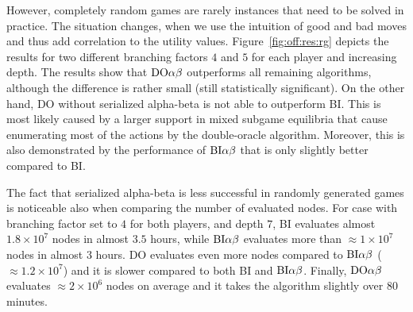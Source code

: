 However, completely random games are rarely instances that need to be solved in practice.
The situation changes, when we use the intuition of good and bad moves and thus add correlation to the utility values.
Figure~\ref{fig:off:res:rg} depicts the results for two different branching factors $4$ and $5$ for each player and increasing depth.
The results show that $\textrm{DO}\alpha\beta$ outperforms all remaining algorithms, although the difference is rather small (still statistically significant).
On the other hand, \textsc{DO} without serialized alpha-beta is not able to outperform \textsc{BI}. 
This is most likely caused by a larger support in mixed subgame equilibria that cause enumerating most of the actions by the double-oracle algorithm. 
Moreover, this is also demonstrated by the performance of $\textrm{BI}\alpha\beta$ that is only slightly better compared to \textsc{BI}.

The fact that serialized alpha-beta is less successful in randomly generated games is noticeable also when comparing the number of evaluated nodes.
For case with branching factor set to $4$ for both players, and depth $7$, \textsc{BI} evaluates almost $1.8\times10^7$ nodes in almost $3.5$ hours, while $\textrm{BI}\alpha\beta$ evaluates more than $\approx1\times10^7$ nodes in almost $3$ hours. 
\textsc{DO} evaluates even more nodes compared to $\textrm{BI}\alpha\beta$ ($\approx1.2\times10^7$) and it is slower compared to both \textsc{BI} and $\textrm{BI}\alpha\beta$. 
Finally, $\textrm{DO}\alpha\beta$ evaluates $\approx2\times10^6$ nodes on average and it takes the algorithm slightly over $80$ minutes.

